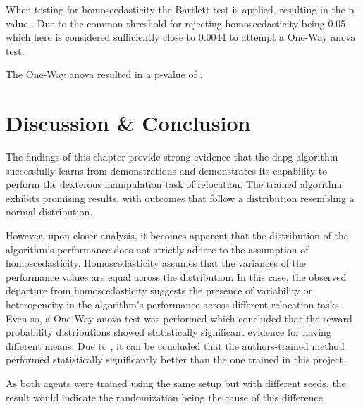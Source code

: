 When testing for homoscedasticity the Bartlett test is applied, resulting in the p-value . Due to the common threshold for rejecting homoscedasticity being \num{0.05}, which here is considered sufficiently close to \num{0.0044} to attempt a One-Way \gls{anova} test. \medskip

The One-Way \gls{anova} resulted in a p-value of . \medskip

\newpage

\section{Discussion \& Conclusion}


The findings of this chapter provide strong evidence that the \gls{dapg} algorithm successfully learns from demonstrations and demonstrates its capability to perform the dexterous manipulation task of relocation. The trained algorithm exhibits promising results, with outcomes that follow a distribution resembling a normal distribution.\medskip

However, upon closer analysis, it becomes apparent that the distribution of the algorithm's performance does not strictly adhere to the assumption of homoscedasticity. Homoscedasticity assumes that the variances of the performance values are equal across the distribution. In this case, the observed departure from homoscedasticity suggests the presence of variability or heterogeneity in the algorithm's performance across different relocation tasks. Even so, a One-Way \gls{anova} test was performed which concluded that the reward probability distributions showed statistically significant evidence for having different means. Due to , it can be concluded that the authors-trained method performed statistically significantly better than the one trained in this project.  \medskip

As both agents were trained using the same setup but with different seeds, the result would indicate the randomization being the cause of this difference. \medskip

